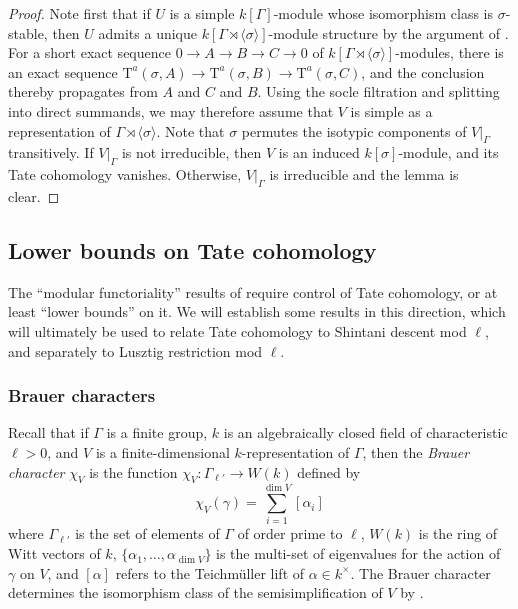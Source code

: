 \documentclass[reqno]{amsart}
\numberwithin{equation}{subsection}
\newcommand{\co}{\colon}
\newcommand{\rT}{\ensuremath{\mathrm{T}}\xspace}
\theoremstyle{remark}
\numberwithin{equation}{subsection}
\numberwithin{figure}{subsection}
\begin{document}
\begin{proof}
    Note first that if $U$ is a simple $k[\Gamma]$-module whose isomorphism class is $\sigma$-stable, then $U$ admits a unique $k[\Gamma \rtimes \langle\sigma\rangle]$-module structure by the argument of \cite[Proposition~6.1]{TV}. For a short exact sequence $0 \to A \to B \to C \to 0$ of $k[\Gamma\rtimes\langle\sigma\rangle]$-modules, there is an exact sequence $\rT^a(\sigma,A) \to \rT^a(\sigma,B) \to \rT^a(\sigma,C)$, and the conclusion thereby propagates from $A$ and $C$ and $B$. Using the socle filtration and splitting into direct summands, we may therefore assume that $V$ is simple as a representation of $\Gamma \rtimes \langle\sigma\rangle$. Note that $\sigma$ permutes the isotypic components of $V|_\Gamma$ transitively. If $V|_\Gamma$ is not irreducible, then $V$ is an induced $k[\sigma]$-module, and its Tate cohomology vanishes. Otherwise, $V|_\Gamma$ is irreducible and the lemma is clear.
\end{proof}


\subsection{Lower bounds on Tate cohomology}\label{ss:tate-lower-bounds} 
The ``modular functoriality'' results of \cite{F24} require control of Tate cohomology, or at least ``lower bounds'' on it. We will establish some results in this direction, which will ultimately be used to relate Tate cohomology to Shintani descent mod $\ell$, and separately to Lusztig restriction mod $\ell$.

\subsubsection{Brauer characters} Recall that if $\Gamma$ is a finite group, $k$ is an algebraically closed field of characteristic $\ell > 0$, and $V$ is a finite-dimensional $k$-representation of $\Gamma$, then the \emph{Brauer character} $\chi_V$ is the function $\chi_V\co \Gamma_{\ell'} \to W(k)$ defined by
\[
\chi_V(\gamma) = \sum_{i=1}^{\dim V} [\alpha_i]
\]
where $\Gamma_{\ell'}$ is the set of elements of $\Gamma$ of order prime to $\ell$, $W(k)$ is the ring of Witt vectors of $k$, $\{\alpha_1, \dots, \alpha_{\dim V}\}$ is the multi-set of eigenvalues for the action of $\gamma$ on $V$, and $[\alpha]$ refers to the Teichm\"uller lift of $\alpha \in k^\times$. The Brauer character determines the isomorphism class of the semisimplification of $V$ by \cite[\S18.2, Corollary~1]{Serre77}.
\end{document}
